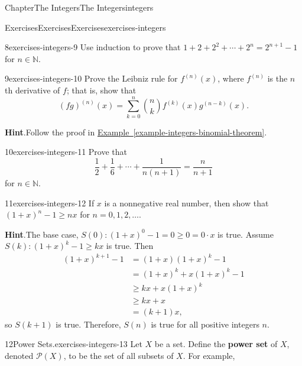 \documentclass[oneside,10pt,]{book}
\newcommand{\blocktitlefont}{\relax}
\newcommand{\xreffont}{\relax}
\newcommand{\terminology}[1]{\textbf{#1}}
\numberwithin{equation}{section}
\begin{document}
\begin{chapterptx}{Chapter}{The Integers}{}{The Integers}{}{}{integers}
\begin{exercises-section}{Exercises}{Exercises}{}{Exercises}{}{}{exercises-integers}
\begin{divisionexercise}{8}{}{}{exercises-integers-9}
Use induction to prove that \(1 + 2 + 2^2 + \cdots + 2^n = 2^{n + 1} - 1\) for \(n \in {\mathbb N}\).%
\end{divisionexercise}%
\begin{divisionexercise}{9}{}{}{exercises-integers-10}%
Prove the Leibniz rule for \(f^{(n)} (x)\), where \(f^{(n)}\) is the \(n\)th derivative of \(f\); that is, show that%
\begin{equation*}
(fg)^{(n)}(x) = \sum_{k = 0}^{n} \binom{n}{k} f^{(k)}(x) g^{(n - k)}(x).
\end{equation*}
%
\par\smallskip%
\noindent\textbf{\blocktitlefont Hint}.\hypertarget{exercises-integers-10-2}{}\quad{}Follow the proof in \hyperref[example-integers-binomial-theorem]{Example~{\xreffont\ref{example-integers-binomial-theorem}}}.%
\end{divisionexercise}%
\begin{divisionexercise}{10}{}{}{exercises-integers-11}%
Prove that%
\begin{equation*}
\frac{1}{2}+ \frac{1}{6} + \cdots + \frac{1}{n(n + 1)} = \frac{n}{n + 1} 
\end{equation*}
for \(n \in {\mathbb N}\).%
\end{divisionexercise}%
\begin{divisionexercise}{11}{}{}{exercises-integers-12}%
If \(x\) is a nonnegative real number, then show that \((1 + x)^n - 1 \geq nx\) for \(n = 0, 1, 2, \ldots\).%
\par\smallskip%
\noindent\textbf{\blocktitlefont Hint}.\hypertarget{exercises-integers-12-2}{}\quad{}The base case, \(S(0): (1 + x)^0 - 1 = 0 \geq 0 = 0 \cdot x\) is true. Assume \(S(k): (1 + x)^k -1 \geq kx\) is true. Then%
\begin{align*}
(1 + x)^{k + 1} - 1 & = (1 + x)(1 + x)^k -1\\
& = (1 + x)^k + x(1 + x)^k - 1\\
& \geq kx + x(1 + x)^k\\
& \geq kx + x\\
& = (k + 1)x,
\end{align*}
so \(S(k + 1)\) is true. Therefore, \(S(n)\) is true for all positive integers \(n\).%
\end{divisionexercise}%
\begin{divisionexercise}{12}{Power Sets.}{}{exercises-integers-13}%
Let \(X\) be a set. Define the \terminology{power set} of \(X\), denoted \({\mathcal P}(X)\), to be the set of all subsets  of \(X\).  \label{exercises-integers-13-2-1-6} For example,%

\end{divisionexercise}
\end{exercises-section}
\end{chapterptx}
\end{document}
